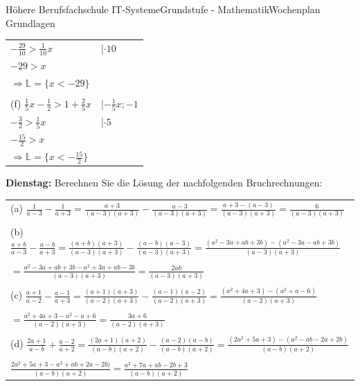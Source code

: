 \documentclass[oneside,openany,headings=optiontotoc,11pt,numbers=noenddot]{scrreprt}
\begin{document}
\begin{worksheet}{Höhere Berufsfachschule IT-Systeme}{Grundstufe - Mathematik}{Wochenplan Grundlagen}
\begin{framed}
\begin{tabularx}{\textwidth}{ll}
				\(-\frac{29}{10} > \frac{1}{10}x\) & |\(\cdot{}10\)\\
				\(-29 > x\)\\
				\(\Rightarrow \mathbb{L} = \{x < -29\}\)\\
				\\
				(f) \(\frac{1}{5}x-\frac{1}{2}>1+\frac{2}{5}x\) & |\(-\frac{1}{5}x; -1\)\\
				\(-\frac{3}{2} > \frac{1}{5}x\) & |\(\cdot{}5\)\\
				\(-\frac{15}{2}> x\)\\
				\(\Rightarrow \mathbb{L} = \{x < -\frac{15}{2}\}\)
			\end{tabularx}
		\end{framed}
		\newpage
		\begin{framed}
			\noindent
			\textbf{Dienstag:} Berechnen Sie die Lösung der nachfolgenden Bruchrechnungen:\\
			\begin{tabularx}{\textwidth}{X}
				\\
				(a) \(\frac{1}{a-3} - \frac{1}{a+3} = \frac{a+3}{(a-3)(a+3)}- \frac{a-3}{(a-3)(a+3)} = \frac{a+3 - (a-3)}{(a-3)(a+3)} = \frac{6}{(a-3)(a+3)}\)\\
				\\
				(b) \(\frac{a+b}{a-3}-\frac{a-b}{a+3} = \frac{(a+b)(a+3)}{(a-3)(a+3)}- \frac{(a-b)(a-3)}{(a-3)(a+3)} = \frac{(a^2-3a+ab+3b) - (a^2 -3a -ab +3b)}{(a-3)(a+3)}\)\\
				\\
				\(= \frac{a^2-3a+ab+3b - a^2 +3a +ab -3b}{(a-3)(a+3)} = \frac{2ab}{(a-3)(a+3)}\)\\
				\\
				(c) \(\frac{a+1}{a-2}- \frac{a-1}{a+3} = \frac{(a+1)(a+3)}{(a-2)(a+3)}- \frac{(a-1)(a-2)}{(a-2)(a+3)} = \frac{(a^2 + 4a + 3) - (a^2 +a -6)}{(a-2)(a+3)}\)\\
				\\
				\(= \frac{a^2 + 4a + 3 - a^2 -a +6}{(a-2)(a+3)} = \frac{3a +6}{(a-2)(a+3)}\)\\
				\\
				(d) \(\frac{2a+1}{a-b} + \frac{a-2}{a+2} = \frac{(2a+1)(a+2)}{(a-b)(a+2)}- \frac{(a-2)(a-b)}{(a-b)(a+2)} = \frac{(2a^2+5a+3) - (a^2 -ab -2a +2b)}{(a-b)(a+2)}\)\\
				\\
				\(\frac{2a^2+5a+3 - a^2 +ab +2a -2b)}{(a-b)(a+2)} = \frac{a^2 + 7a +ab -2b +3}{(a-b)(a+2)}\)
			\end{tabularx}
		\end{framed}

\end{worksheet}
\end{document}
